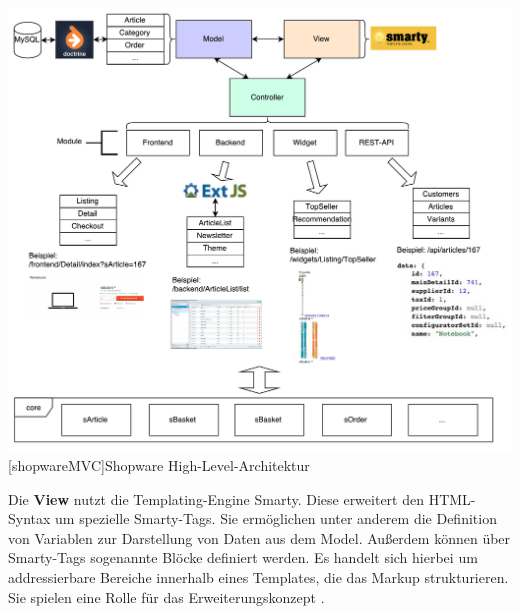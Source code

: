 \documentclass[12pt,a4paper,bibliography=totocnumbered,listof=totoc]{scrartcl}
\begin{document}
\vspace{1em}
\begin{minipage}{\linewidth}
	\centering
	\includegraphics[width=1\linewidth]{Abbildungen/shopwareMVC.pdf}
	[shopwareMVC]{Shopware High-Level-Architektur}
	\label{fig:shopwareMVC}
\end{minipage}
\vspace{1em}

Die \textbf{View} nutzt die Templating-Engine Smarty. Diese erweitert den HTML-Syntax um spezielle Smarty-Tags. Sie ermöglichen unter anderem die Definition von Variablen zur Darstellung von Daten aus dem Model. Außerdem können über Smarty-Tags sogenannte Blöcke definiert werden. Es handelt sich hierbei um addressierbare Bereiche innerhalb eines Templates, die das Markup strukturieren. Sie spielen eine Rolle für das Erweiterungskonzept \citep{shopware5Docs}.
\end{document}
